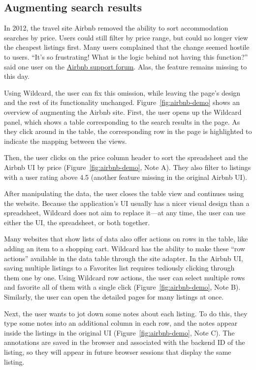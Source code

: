 \documentclass[sigplan,10pt,anonymous,review]{acmart}
\begin{document}
\hypertarget{augmenting-search-results}{%
\subsection{Augmenting search results}\label{augmenting-search-results}}

In 2012, the travel site Airbnb removed the ability to sort
accommodation searches by price. Users could still filter by price
range, but could no longer view the cheapest listings first. Many users
complained that the change seemed hostile to users. ``It's so
frustrating! What is the logic behind not having this function?'' said
one user on the
\href{https://community.withairbnb.com/t5/Hosting/Sorting-listing-by-price/td-p/559404}{Airbnb
support forum}. Alas, the feature remains missing to this day.

Using Wildcard, the user can fix this omission, while leaving the page's
design and the rest of its functionality unchanged.{
Figure~\ref{fig:airbnb-demo} shows an overview of augmenting the Airbnb
site.} First, the user opens up the Wildcard panel, which shows a table
corresponding to the search results in the page. As they click around in
the table, the corresponding row in the page is highlighted to indicate
the mapping between the views.

Then, the user clicks on the price column header to sort the spreadsheet
and the Airbnb UI by price{ (Figure~\ref{fig:airbnb-demo}, Note A)}.
They also filter to listings with a user rating above 4.5 (another
feature missing in the original Airbnb UI).

After manipulating the data, the user closes the table view and
continues using the website. Because the application's UI usually has a
nicer visual design than a spreadsheet, Wildcard does not aim to replace
it---at any time, the user can use either the UI, the spreadsheet, or
both together.

Many websites that show lists of data also offer actions on rows in the
table, like adding an item to a shopping cart. Wildcard has the ability
to make these ``row actions'' available in the data table through the
site adapter. In the Airbnb UI, saving multiple listings to a Favorites
list requires tediously clicking through them one by one. Using Wildcard
row actions, the user can select multiple rows and favorite all of them
with a single click{ (Figure~\ref{fig:airbnb-demo}, Note B)}. Similarly,
the user can open the detailed pages for many listings at once.

Next, the user wants to jot down some notes about each listing. To do
this, they type some notes into an additional column in each row, and
the notes appear inside the listings in the original UI{
(Figure~\ref{fig:airbnb-demo}, Note C)}. The annotations are saved in
the browser and associated with the backend ID of the listing, so they
will appear in future browser sessions that display the same listing.
\end{document}
